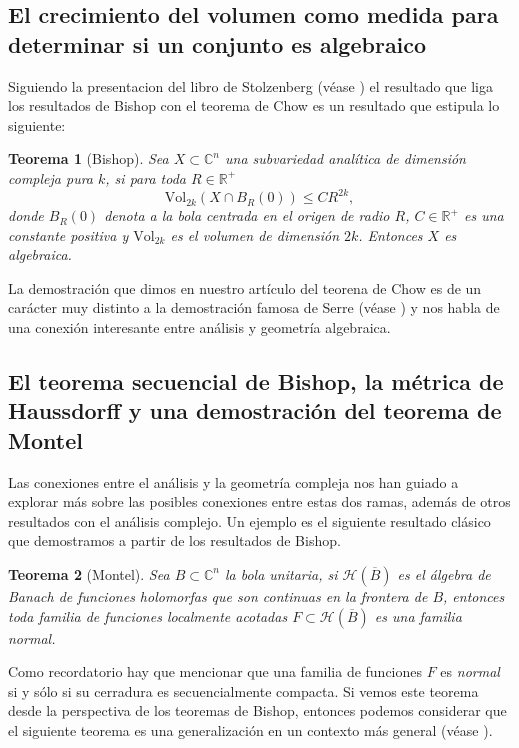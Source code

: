 \documentclass{article}
\newtheorem{teorema}{Teorema}[section]
\newcommand{\con}{\ensuremath{\mathbb{C}^n}}
\newcommand{\re}{\ensuremath{\mathbb R }}
\begin{document}
\subsection{El crecimiento del volumen como medida para determinar si un conjunto es algebraico}
\noindent Siguiendo la presentacion del libro de Stolzenberg (v\'ease \cite{Stolzenberg}) el resultado que liga 
los resultados de Bishop con el teorema de Chow es un resultado que estipula lo siguiente:
\begin{teorema}[Bishop]\label{Bishop1}
        Sea $X\subset\con$ una subvariedad anal\'itica de dimensi\'on compleja pura $k$, si para toda $R\in\re^+$
        $$\textrm{Vol}_{2k}(X\cap B_R(0))\leq CR^{2k},$$
        donde $B_R(0)$ denota a la bola centrada en el origen de radio $R$, $C\in\re^{+}$ es una constante positiva
        y $\textrm{Vol}_{2k}$ es el volumen de dimensi\'on $2k$. Entonces $X$ es algebraica.
\end{teorema}
\noindent La demostraci\'on que dimos en nuestro art\'iculo del teorena de Chow es de un car\'acter muy distinto a la demostraci\'on 
famosa de Serre (v\'ease \cite{GAGA}) y nos habla de una conexi\'on interesante entre an\'alisis y geometr\'ia algebraica.

\subsection{El teorema secuencial de Bishop, la m\'etrica de Haussdorff y una demostraci\'on del teorema de Montel}
\noindent Las conexiones entre el an\'alisis y la geometr\'ia compleja nos han guiado a explorar m\'as sobre las posibles conexiones entre estas dos ramas,
adem\'as de otros resultados con el an\'alisis complejo. Un ejemplo es el siguiente resultado cl\'asico que demostramos
a partir de los resultados de Bishop. 
\begin{teorema}[Montel]\label{Montel}
        Sea $B\subset\con$ la bola unitaria, si $\mathcal{H}(\overline{B})$ es el \'algebra de Banach de funciones holomorfas que son continuas 
        en la frontera de $B$, entonces toda familia de funciones localmente acotadas $F\subset\mathcal{H}(\overline{B})$ es una familia \textit{normal}.
\end{teorema}
Como recordatorio hay que mencionar que una familia de funciones $F$ es \textit{normal} si y s\'olo si su cerradura es secuencialmente compacta. Si vemos este 
teorema desde la perspectiva de los teoremas de Bishop, entonces podemos considerar que el siguiente teorema es una generalizaci\'on en
un contexto m\'as general (v\'ease \cite[p. 30]{Stolzenberg}).
\end{document}

